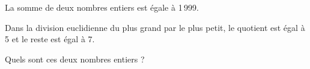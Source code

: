 
La somme de deux nombres entiers est égale à 1\,999. 
\par Dans la division euclidienne du  plus grand par le plus petit, le
quotient est égal à 5 et le reste est égal à 7. 
\par Quels sont ces deux nombres entiers ? 

 

